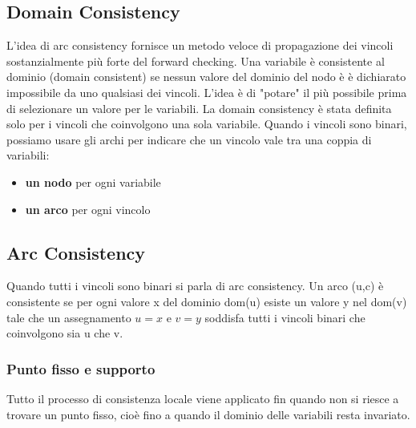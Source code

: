 \subsection{Domain Consistency}
L’idea di arc consistency fornisce un metodo veloce di propagazione dei vincoli sostanzialmente più forte del forward checking. Una variabile è consistente al dominio (domain consistent) se nessun valore del dominio del nodo è è dichiarato impossibile da uno qualsiasi dei vincoli. L’idea è di "potare" il più possibile prima di selezionare un valore per le variabili. La domain consistency è stata definita solo per i vincoli che coinvolgono una sola variabile. Quando i vincoli sono binari, possiamo usare gli archi per indicare che un vincolo vale tra una coppia di variabili:
\begin{itemize}
    \item \textbf{un nodo} per ogni variabile
    \item \textbf{un arco} per ogni vincolo
\end{itemize}
\subsection{Arc Consistency}
Quando tutti i vincoli sono binari si parla di arc consistency. Un arco (u,c) è consistente se per ogni valore x del dominio dom(u) esiste un valore y nel dom(v) tale che un assegnamento $u=x$ e $v=y$ soddisfa tutti i vincoli binari che coinvolgono sia u che v.
\subsubsection{Punto fisso e supporto}
Tutto il processo di consistenza locale viene applicato fin quando non si riesce a trovare un punto fisso, cioè fino a quando il dominio delle variabili resta invariato.

\vspace{0.5cm}

